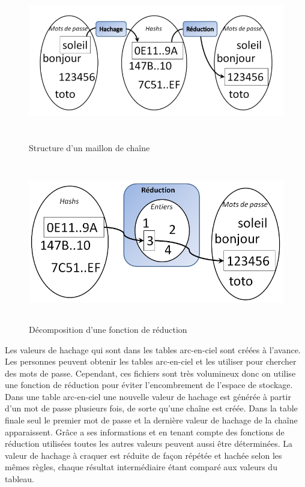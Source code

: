 \documentclass[a4paper,12pt]{article}
\begin{document}
    \begin{figure}[H]
    \centering
    \includegraphics[height=7cm]{img/schema.png}
    \caption{Structure d’un maillon de chaîne}
    \end{figure}

    \begin{figure}[H]
    \centering
    \includegraphics[height=7cm]{img/fonction_reduction.png}
    \caption{Décomposition d’une fonction de réduction}
    \end{figure}
    
    Les valeurs de hachage qui sont dans les tables arc-en-ciel sont créées à l’avance. Les personnes peuvent obtenir les tables arc-en-ciel et les utiliser pour chercher des mots de passe. Cependant, ces fichiers sont très volumineux donc on utilise une fonction de réduction pour éviter l’encombrement de l’espace de stockage. Dans une table arc-en-ciel une nouvelle valeur de hachage est générée à partir d'un mot de passe plusieurs fois, de sorte qu’une chaîne est créée. Dans la table finale seul le premier mot de passe et la dernière valeur de hachage de la chaîne apparaissent. Grâce a ses informations et en tenant compte des fonctions de réduction utilisées toutes les autres valeurs peuvent aussi être déterminées. La valeur de hachage à craquer est réduite de façon répétée et hachée selon les mêmes règles, chaque résultat intermédiaire étant comparé aux valeurs du tableau.
\end{document}
